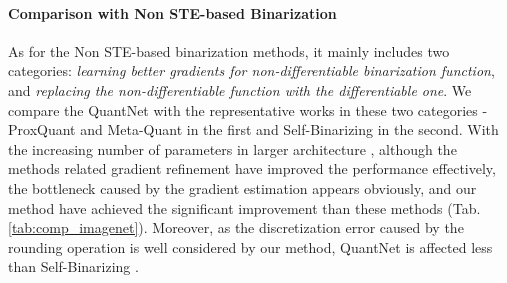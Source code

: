 \documentclass[runningheads]{llncs}
\begin{document}
\paragraph{\textbf{Comparison with Non STE-based Binarization}}
As for the Non STE-based binarization methods,
it mainly includes two categories: \emph{learning better gradients for non-differentiable binarization function},
and \emph{replacing the non-differentiable function with the differentiable one}.
We compare the QuantNet with the representative works in these two categories -
ProxQuant \cite{bai2019prox} and Meta-Quant \cite{chen2019meta} in the first
and Self-Binarizing \cite{lahoud2019self} in the second.
With the increasing number of parameters in larger architecture \cite{he2016deep},
although the methods \cite{bai2019prox,chen2019meta}
related gradient refinement have improved the performance effectively,
the bottleneck caused by the gradient estimation appears obviously,
and our method have achieved the significant improvement than these methods (Tab. \ref{tab:comp_imagenet}).
Moreover, as the discretization error caused by the rounding operation is well considered by our method,
QuantNet is affected less than Self-Binarizing \cite{lahoud2019self}.
\end{document}
